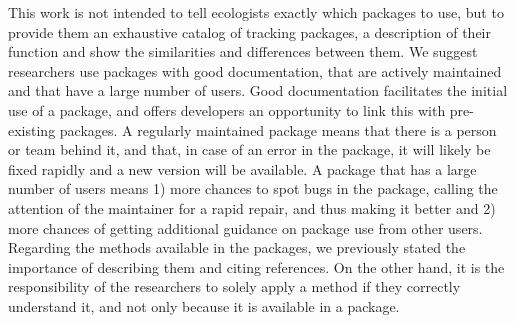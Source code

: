 \documentclass[a4paper,12pt]{article}
\begin{document}
{This work is not intended to tell ecologists exactly which packages to use, %
but to provide them an exhaustive catalog of tracking packages, a description of their function and show the similarities and differences between them. We suggest researchers use packages with good documentation, that are actively maintained and that have a large number of users. Good documentation facilitates the initial use of a package, and offers developers an opportunity to link this with pre-existing packages. %
A regularly maintained package means that there is a person or team behind it, and that, in case of an error in the package, it will likely be fixed rapidly and a new version will be available. A package that has a large number of users means 1) more chances to spot bugs in the package, calling the attention of the maintainer for a rapid repair, and thus making it better and 2) more chances of getting additional guidance on package use from other users. Regarding the methods available in the packages, we previously stated the importance of describing them and citing references. On the other hand, it is the responsibility of the researchers to solely apply a method if they correctly understand it, and not only because it is available in a package. 

}
\end{document}
